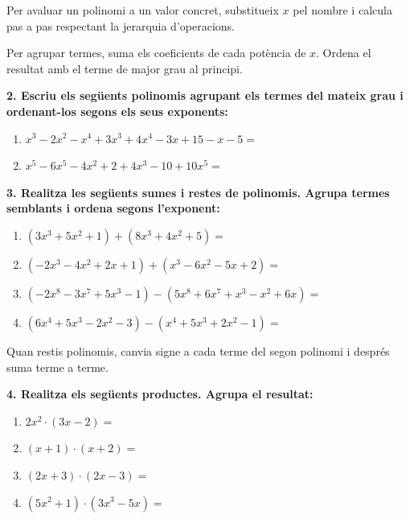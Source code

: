\documentclass[12pt,a4paper]{article}
\begin{document}
\begin{capsula}
Per avaluar un polinomi a un valor concret, substitueix $x$ pel nombre i calcula pas a pas respectant la jerarquia d'operacions.

Per agrupar termes, suma els coeficients de cada potència de $x$. Ordena el resultat amb el terme de major grau al principi.
\end{capsula}

\textbf{2. Escriu els següents polinomis agrupant els termes del mateix grau i ordenant-los segons els seus exponents:}
\begin{enumerate}[label=\alph*)]
    \item $x^3 - 2x^2 - x^4 + 3x^3 + 4x^4 - 3x + 15 - x - 5 =$ \vspace{1cm}
    \item $x^5 - 6x^5 - 4x^2 + 2 + 4x^3 - 10 + 10x^5 =$ \vspace{1cm}
\end{enumerate}

\newpage



\textbf{3. Realitza les següents sumes i restes de polinomis. Agrupa termes semblants i ordena segons l'exponent:}
\begin{enumerate}[label=\alph*)]
    \item $(3x^3 + 5x^2 + 1) + (8x^3 + 4x^2 + 5) =$ \vspace{1.2cm}
    \item $(-2x^3 - 4x^2 + 2x + 1) + (x^3 - 6x^2 - 5x + 2) =$ \vspace{1.2cm}
    \item $(-2x^8 - 3x^7 + 5x^3 - 1) - (5x^8 + 6x^7 + x^3 - x^2 + 6x) =$ \vspace{1.2cm}
    \item $(6x^4 + 5x^3 - 2x^2 - 3) - (x^4 + 5x^3 + 2x^2 - 1) =$ \vspace{1.2cm}
\end{enumerate}

\begin{capsula}
Quan restis polinomis, canvia signe a cada terme del segon polinomi i després suma terme a terme.
\end{capsula}

\textbf{4. Realitza els següents productes. Agrupa el resultat:}
\begin{enumerate}[label=\alph*)]
    \item $2x^2\cdot(3x-2) =$ \vspace{0.8cm}
    \item $(x+1)\cdot(x+2) =$ \vspace{0.8cm}
    \item $(2x+3)\cdot(2x-3) =$ \vspace{0.8cm}
    \item $(5x^2+1)\cdot(3x^3-5x) =$ \vspace{1cm}
\end{enumerate}
\end{document}

